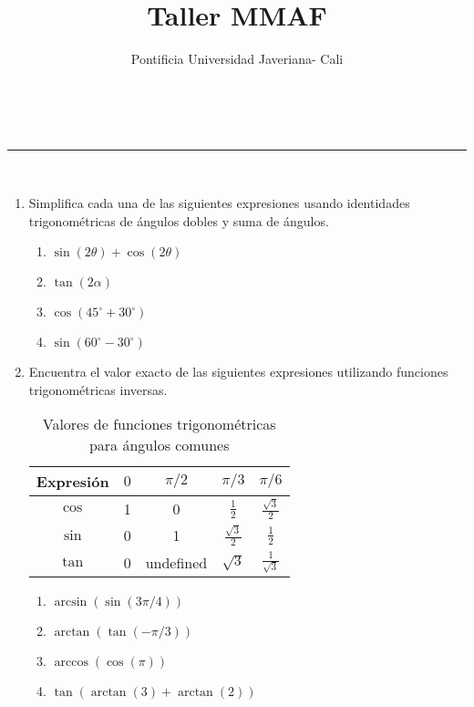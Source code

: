 \documentclass[a4paper,11pt]{article}
\makeatletter
\newcommand{\linia}{\rule{\linewidth}{0.5pt}}
\theoremstyle{mytheor}
\renewcommand{\maketitle}{
	\begin{center}
		\vspace{2ex}
		{\huge \textsc{\@title}}				
		\vspace{1ex}
		\\
		\linia\\
		\@author \hfill \@date
		\vspace{4ex}
	\end{center}
}
\makeatother
\begin{document}
	
	\title{Taller  MMAF}	
	\author{Pontificia Universidad Javeriana- Cali}
	
	
	\maketitle
	
	\begin{enumerate}
		
		
		\item
Simplifica cada una de las siguientes expresiones usando identidades trigonométricas de ángulos dobles y suma de ángulos.
\begin{enumerate}
    \item \( \sin(2\theta) + \cos(2\theta) \)
    \item \( \tan(2\alpha) \)
    \item \( \cos(45^\circ + 30^\circ) \)
    \item \( \sin(60^\circ - 30^\circ) \)
\end{enumerate}

\item 
Encuentra el valor exacto de las siguientes expresiones utilizando funciones trigonométricas inversas.

\begin{table}[H]
    \centering
    \begin{tabular}{|c|c|c|c|c|}
    \hline
    \textbf{Expresión} & $0$ & $\pi/2$ & $\pi/3$ & $\pi/6$ \\ \hline
    $\cos$ & 1 & 0 & $\frac{1}{2}$ & $\frac{\sqrt{3}}{2}$ \\ \hline
    $\sin$ & 0 & 1 & $\frac{\sqrt{3}}{2}$ & $\frac{1}{2}$ \\ \hline
    $\tan$ & 0 & undefined & $\sqrt{3}$ & $\frac{1}{\sqrt{3}}$ \\ \hline
    \end{tabular}
    \caption{Valores de funciones trigonométricas para ángulos comunes}
    \label{tab:trig_values}
    \end{table}

\begin{enumerate}
    \item \( \arcsin(\sin(3\pi/4)) \)
    \item \( \arctan(\tan(-\pi/3)) \)
    \item \( \arccos(\cos(\pi)) \)
    \item \( \tan(\arctan(3) + \arctan(2)) \)
\end{enumerate}


\end{enumerate}
\end{document}
